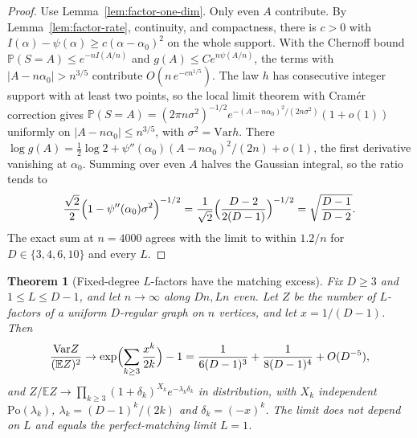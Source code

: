 \documentclass[11pt]{article}
\newtheorem{theorem}{Theorem}
\newcommand{\EE}{\mathbb{E}}
\newcommand{\PP}{\mathbb{P}}
\newcommand{\Var}{\mathrm{Var}}
\begin{document}
\begin{proof}
Use Lemma~\ref{lem:factor-one-dim}. Only even \(A\) contribute. By
Lemma~\ref{lem:factor-rate}, continuity, and compactness, there is \(c>0\) with
\(I(\alpha)-\psi(\alpha)\ge c(\alpha-\alpha_0)^2\) on the whole support. With
the Chernoff bound \(\PP(S=A)\le e^{-nI(A/n)}\) and
\(g(A)\le Ce^{n\psi(A/n)}\), the terms with
\(\lvert A-n\alpha_0\rvert>n^{3/5}\) contribute
\(O(n\,e^{-cn^{1/5}})\). The law \(h\) has consecutive integer support with at
least two points, so the local limit theorem with Cram\'er correction gives
\(\PP(S=A)=(2\pi n\sigma^2)^{-1/2}e^{-(A-n\alpha_0)^2/(2n\sigma^2)}(1+o(1))\)
uniformly on \(\lvert A-n\alpha_0\rvert\le n^{3/5}\), with
\(\sigma^2=\Var h\). There
\(\log g(A)=\tfrac12\log2+\psi''(\alpha_0)(A-n\alpha_0)^2/(2n)+o(1)\), the first
derivative vanishing at \(\alpha_0\). Summing over even \(A\) halves the
Gaussian integral, so the ratio tends to
\[
\frac{\sqrt2}{2}\Bigl(1-\psi''(\alpha_0)\sigma^2\Bigr)^{-1/2}
=
\frac1{\sqrt2}\Bigl(\frac{D-2}{2(D-1)}\Bigr)^{-1/2}
=
\sqrt{\frac{D-1}{D-2}} .
\]
The exact sum at \(n=4000\) agrees with the limit to within \(1.2/n\) for
\(D\in\{3,4,6,10\}\) and every \(L\).
\end{proof}

\begin{theorem}[Fixed-degree \(L\)-factors have the matching excess]
\label{thm:fixed-degree-factor}
Fix \(D\ge3\) and \(1\le L\le D-1\), and let \(n\to\infty\) along \(Dn,Ln\) even.
Let \(Z\) be the number of \(L\)-factors of a uniform \(D\)-regular graph on
\(n\) vertices, and let \(x=1/(D-1)\). Then
\[
\frac{\Var Z}{(\EE Z)^2}
\to
\exp\Bigl(\sum_{k\ge3}\frac{x^k}{2k}\Bigr)-1
=
\frac{1}{6(D-1)^3}+\frac1{8(D-1)^4}+O(D^{-5}),
\]
and \(Z/\EE Z\to\prod_{k\ge3}(1+\delta_k)^{X_k}e^{-\lambda_k\delta_k}\) in
distribution, with \(X_k\) independent \(\mathrm{Po}(\lambda_k)\),
\(\lambda_k=(D-1)^k/(2k)\) and \(\delta_k=(-x)^k\). The limit does not depend
on \(L\) and equals the perfect-matching limit \(L=1\).
\end{theorem}
\end{document}
